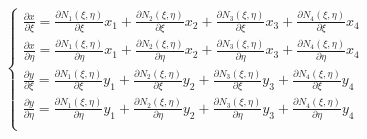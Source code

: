 \documentclass[a4paper]{jpconf}
\begin{document}
\begin{equation}
\begin{cases}
\frac{\partial x}{\partial \xi} = \frac{\partial N_{1}\left(\xi,\eta\right)}{\partial \xi}x_{1}+\frac{\partial N_{2}\left(\xi,\eta\right)}{\partial \xi}x_{2}+\frac{\partial N_{3}\left(\xi,\eta\right)}{\partial \xi}x_{3}+\frac{\partial N_{4}\left(\xi,\eta\right)}{\partial \xi}x_{4}\\
\frac{\partial x}{\partial \eta} = \frac{\partial N_{1}\left(\xi,\eta\right)}{\partial \eta}x_{1}+\frac{\partial N_{2}\left(\xi,\eta\right)}{\partial \eta}x_{2}+\frac{\partial N_{3}\left(\xi,\eta\right)}{\partial \eta}x_{3}+\frac{\partial N_{4}\left(\xi,\eta\right)}{\partial \eta}x_{4}\\
\frac{\partial y}{\partial \xi} = \frac{\partial N_{1}\left(\xi,\eta\right)}{\partial \xi}y_{1}+\frac{\partial N_{2}\left(\xi,\eta\right)}{\partial \xi}y_{2}+\frac{\partial N_{3}\left(\xi,\eta\right)}{\partial \xi}y_{3}+\frac{\partial N_{4}\left(\xi,\eta\right)}{\partial \xi}y_{4}\\
\frac{\partial y}{\partial \eta} = \frac{\partial N_{1}\left(\xi,\eta\right)}{\partial \eta}y_{1}+\frac{\partial N_{2}\left(\xi,\eta\right)}{\partial \eta}y_{2}+\frac{\partial N_{3}\left(\xi,\eta\right)}{\partial \eta}y_{3}+\frac{\partial N_{4}\left(\xi,\eta\right)}{\partial \eta}y_{4}\\
\end{cases}
\end{equation}
\end{document}
